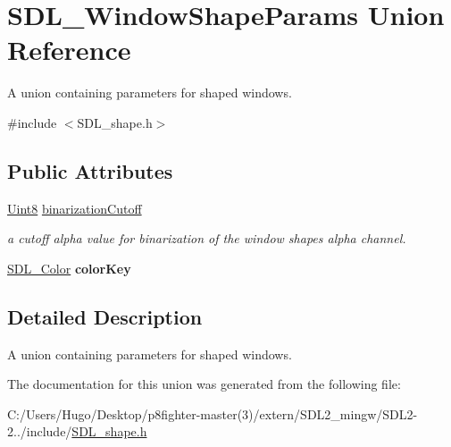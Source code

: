 \hypertarget{union_s_d_l___window_shape_params}{}\section{S\+D\+L\+\_\+\+Window\+Shape\+Params Union Reference}
\label{union_s_d_l___window_shape_params}


A union containing parameters for shaped windows.  




{\ttfamily \#include $<$S\+D\+L\+\_\+shape.\+h$>$}

\subsection*{Public Attributes}
\begin{DoxyCompactItemize}
\item 
\mbox{\label{union_s_d_l___window_shape_params_a534c40b09588a8075c0a70227753dc56}} 
\hyperlink{_s_d_l__stdinc_8h_a2944638813a090aa23e62f4da842c3e2}{Uint8} \hyperlink{union_s_d_l___window_shape_params_a534c40b09588a8075c0a70227753dc56}{binarization\+Cutoff}
\begin{DoxyCompactList}\small\item\em a cutoff alpha value for binarization of the window shape\textquotesingle{}s alpha channel. \end{DoxyCompactList}\item 
\mbox{\label{union_s_d_l___window_shape_params_a8bf3e442a51a1bbf452cfec7c1ed5318}} 
\hyperlink{struct_s_d_l___color}{S\+D\+L\+\_\+\+Color} {\bfseries color\+Key}
\end{DoxyCompactItemize}


\subsection{Detailed Description}
A union containing parameters for shaped windows. 

The documentation for this union was generated from the following file\+:\begin{DoxyCompactItemize}
\item 
C\+:/\+Users/\+Hugo/\+Desktop/p8fighter-\/master(3)/extern/\+S\+D\+L2\+\_\+mingw/\+S\+D\+L2-\/2../include/\hyperlink{_s_d_l__shape_8h}{S\+D\+L\+\_\+shape.\+h}\end{DoxyCompactItemize}
